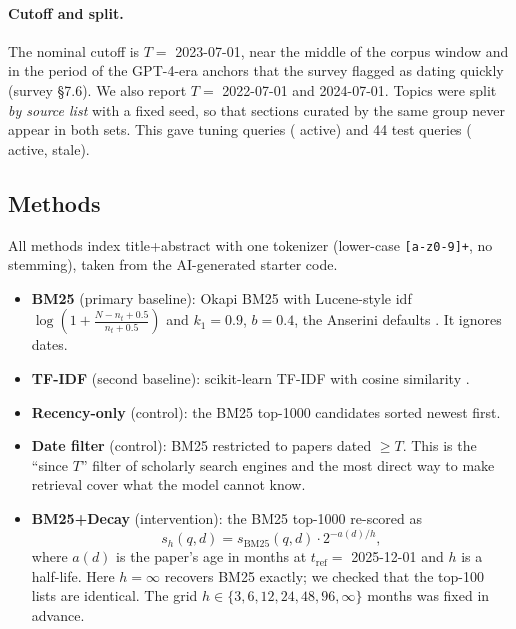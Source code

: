 \documentclass[acmsmall]{acmart}
\begin{document}
\paragraph{Cutoff and split.} The nominal cutoff is $T=$ 2023-07-01, near the middle of the corpus window and in the period of the GPT-4-era anchors that the survey flagged as dating quickly (survey \S7.6). We also report $T=$ 2022-07-01 and 2024-07-01. Topics were split \emph{by source list} with a fixed seed, so that sections curated by the same group never appear in both sets. This gave \NTune{} tuning queries (\NTuneAct{} active) and 44 test queries (\NTestAct{} active, \NTestStale{} stale).

\subsection{Methods}
All methods index title+abstract with one tokenizer (lower-case \texttt{[a-z0-9]+}, no stemming), taken from the AI-generated starter code.
\begin{itemize}
\item \textbf{BM25} (primary baseline): Okapi BM25 with Lucene-style idf $\log(1+\frac{N-n_t+0.5}{n_t+0.5})$ and $k_1=0.9$, $b=0.4$, the Anserini defaults \cite{yang2017anserini,robertson2009bm25}. It ignores dates.
\item \textbf{TF-IDF} (second baseline): scikit-learn TF-IDF with cosine similarity \cite{pedregosa2011sklearn}.
\item \textbf{Recency-only} (control): the BM25 top-1000 candidates sorted newest first.
\item \textbf{Date filter} (control): BM25 restricted to papers dated $\geq T$. This is the ``since $T$'' filter of scholarly search engines and the most direct way to make retrieval cover what the model cannot know.
\item \textbf{BM25+Decay} (intervention): the BM25 top-1000 re-scored as
\begin{equation}\label{eq:decay}
s_h(q,d)=s_{\text{BM25}}(q,d)\cdot 2^{-a(d)/h},
\end{equation}
where $a(d)$ is the paper's age in months at $t_{\text{ref}}=$ 2025-12-01 and $h$ is a half-life. Here $h=\infty$ recovers BM25 exactly; we checked that the top-100 lists are identical. The grid $h\in\{3,6,12,24,48,96,\infty\}$ months was fixed in advance.
\end{itemize}
\end{document}
